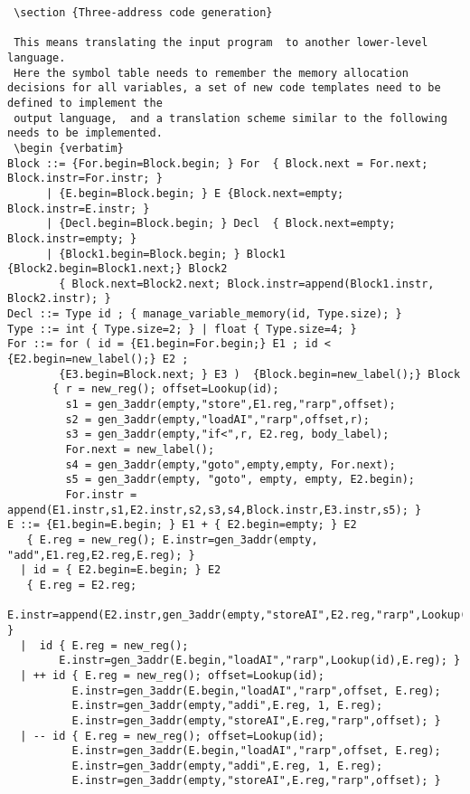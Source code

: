 \documentclass[11pt]{article}
\begin{document}
\begin {verbatim}
 \section {Three-address code generation}
 
 This means translating the input program  to another lower-level language. 
 Here the symbol table needs to remember the memory allocation decisions for all variables, a set of new code templates need to be defined to implement the
 output language,  and a translation scheme similar to the following needs to be implemented. 
 \begin {verbatim}
Block ::= {For.begin=Block.begin; } For  { Block.next = For.next; Block.instr=For.instr; }
      | {E.begin=Block.begin; } E {Block.next=empty; Block.instr=E.instr; }
      | {Decl.begin=Block.begin; } Decl  { Block.next=empty; Block.instr=empty; }
      | {Block1.begin=Block.begin; } Block1 {Block2.begin=Block1.next;} Block2 
        { Block.next=Block2.next; Block.instr=append(Block1.instr, Block2.instr); }
Decl ::= Type id ; { manage_variable_memory(id, Type.size); }
Type ::= int { Type.size=2; } | float { Type.size=4; }
For ::= for ( id = {E1.begin=For.begin;} E1 ; id < {E2.begin=new_label();} E2 ; 
        {E3.begin=Block.next; } E3 )  {Block.begin=new_label();} Block  
       { r = new_reg(); offset=Lookup(id); 
         s1 = gen_3addr(empty,"store",E1.reg,"rarp",offset); 
         s2 = gen_3addr(empty,"loadAI","rarp",offset,r);
         s3 = gen_3addr(empty,"if<",r, E2.reg, body_label); 
         For.next = new_label(); 
         s4 = gen_3addr(empty,"goto",empty,empty, For.next); 
         s5 = gen_3addr(empty, "goto", empty, empty, E2.begin); 
         For.instr = append(E1.instr,s1,E2.instr,s2,s3,s4,Block.instr,E3.instr,s5); }
E ::= {E1.begin=E.begin; } E1 + { E2.begin=empty; } E2 
   { E.reg = new_reg(); E.instr=gen_3addr(empty, "add",E1.reg,E2.reg,E.reg); }
  | id = { E2.begin=E.begin; } E2 
   { E.reg = E2.reg; 
     E.instr=append(E2.instr,gen_3addr(empty,"storeAI",E2.reg,"rarp",Lookup(id))); }
  |  id { E.reg = new_reg(); 
        E.instr=gen_3addr(E.begin,"loadAI","rarp",Lookup(id),E.reg); }
  | ++ id { E.reg = new_reg(); offset=Lookup(id);
          E.instr=gen_3addr(E.begin,"loadAI","rarp",offset, E.reg);
          E.instr=gen_3addr(empty,"addi",E.reg, 1, E.reg);
          E.instr=gen_3addr(empty,"storeAI",E.reg,"rarp",offset); }
  | -- id { E.reg = new_reg(); offset=Lookup(id);
          E.instr=gen_3addr(E.begin,"loadAI","rarp",offset, E.reg);
          E.instr=gen_3addr(empty,"addi",E.reg, 1, E.reg);
          E.instr=gen_3addr(empty,"storeAI",E.reg,"rarp",offset); }

\end{verbatim}
\end{document}
